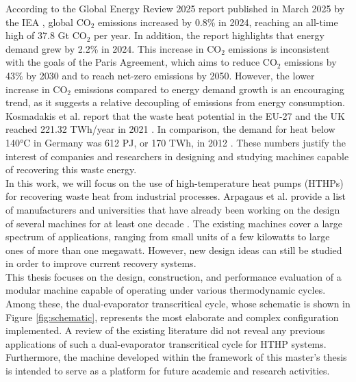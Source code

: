 According to the Global Energy Review 2025 report published in March 2025 by the 
IEA \cite{international2025global}, global $\text{CO}_2$ emissions increased by 0.8\% in 2024, 
reaching an all-time high of 37.8 Gt $\text{CO}_2$ per year. In addition, the report highlights 
that energy demand grew by 2.2\% in 2024. This increase in $\text{CO}_2$ emissions is inconsistent 
with the goals of the Paris Agreement, which aims to reduce $\text{CO}_2$ emissions by 43\% by 2030
 and to reach net-zero emissions by 2050. However, the lower increase in $\text{CO}_2$ emissions
  compared to energy demand growth is an encouraging trend, as it suggests a relative decoupling 
  of emissions from energy consumption. \\

Kosmadakis et al. report that the waste heat potential in the EU-27
 and the UK reached 221.32 TWh/year in 2021 \cite{kosmadakis2024industrial}. In comparison, the demand for heat below 140°C 
 in Germany was 612 PJ, or 170 TWh, in 2012 \cite{arpagaus2018high}. These numbers justify the
 interest of companies and researchers in designing and studying machines capable of recovering
 this waste energy. \\

In this work, we will focus on the use of high-temperature heat pumps (HTHPs) for 
recovering waste heat from industrial processes. Arpagaus et al.  
provide a list of manufacturers and universities that have already been working on the design 
of several machines for at least one decade \cite{arpagaus2018high}. The existing machines cover a large spectrum of 
applications, ranging from small units of a few kilowatts to large ones of more than one megawatt. 
However, new design ideas can still be studied in order to improve current recovery systems.\\

This thesis focuses on the design, construction, and performance evaluation of a 
modular machine capable of operating under various thermodynamic cycles. 
Among these, the dual-evaporator transcritical cycle, whose schematic is shown in Figure 
\ref{fig:schematic}, represents the most elaborate and complex configuration 
implemented. A review of the existing literature did not reveal any previous applications 
of such a dual-evaporator transcritical cycle for HTHP systems. Furthermore, the machine developed 
within the framework of this master's thesis is intended to serve as a platform for 
future academic and research activities.